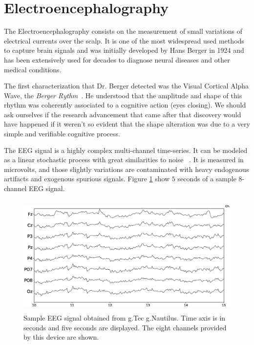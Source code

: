 \documentclass[brainsci,article,submit,moreauthors,pdftex,10pt,a4paper]{mdpi}
\begin{document}
\section{Electroencephalography}
\label{EEG}

The Electroencephalography consists on the measurement of small variations of electrical currents over the scalp.  It is one of the most widespread used methods to capture brain signals and was initially developed by Hans Berger in 1924 and has been extensively used for decades to diagnose neural diseases and other medical conditions.

The first characterization that Dr. Berger detected was the Visual Cortical Alpha Wave, the \textit{Berger Rythm}~\citep{Jansen1991}.  He understood that the amplitude and shape of this rhythm was coherently associated to a cognitive action (eyes closing).  
We should ask ourselves if the research advancement that came after that discovery would have happened if it weren't so evident that the shape alteration was due to a very simple and verifiable cognitive process.

The EEG signal is a highly complex multi-channel time-series.  It can be modeled as a linear stochastic process with great similarities to noise ~\citep{Thakor2004}.  It is measured in microvolts, and those slightly variations are contaminated with heavy endogenous artifacts and exogenous spurious signals.  Figure \ref{fig:sampleeeg} show $5$ seconds of a sample 8-channel EEG signal.
 
\begin{figure}[H]
\centering
\includegraphics[height=6cm,width=12cm]{images/sampleeeg.eps}
\caption{Sample EEG signal obtained from g.Tec g.Nautilus.  Time axis is in seconds and five seconds are displayed.  The eight channels provided by this device are shown.}
\label{fig:sampleeeg}
\end{figure}

\end{document}
